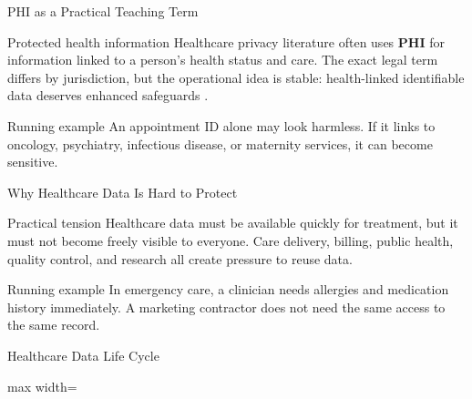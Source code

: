 \documentclass[presentation]{beamer}
\begin{document}
\begin{frame}[c]{PHI as a Practical Teaching Term}
\begin{block}{Protected health information}
Healthcare privacy literature often uses \textbf{PHI} for information linked to a person's health
status and care. The exact legal term differs by jurisdiction, but the operational idea is stable:
health-linked identifiable data deserves enhanced safeguards \cite{conduah2025}.
\end{block}

\begin{exampleblock}{Running example}
An appointment ID alone may look harmless. If it links to oncology, psychiatry, infectious disease,
or maternity services, it can become sensitive.
\end{exampleblock}
\end{frame}

\begin{frame}[c]{Why Healthcare Data Is Hard to Protect}
\begin{block}{Practical tension}
Healthcare data must be available quickly for treatment, but it must not become freely visible to
everyone. Care delivery, billing, public health, quality control, and research all create pressure to
reuse data.
\end{block}

\begin{exampleblock}{Running example}
In emergency care, a clinician needs allergies and medication history immediately. A marketing
contractor does not need the same access to the same record.
\end{exampleblock}
\end{frame}

\begin{frame}[c]{Healthcare Data Life Cycle}
\begin{center}
\begin{adjustbox}{max width=\textwidth}
\end{adjustbox}
\end{center}
\end{frame}
\end{document}
